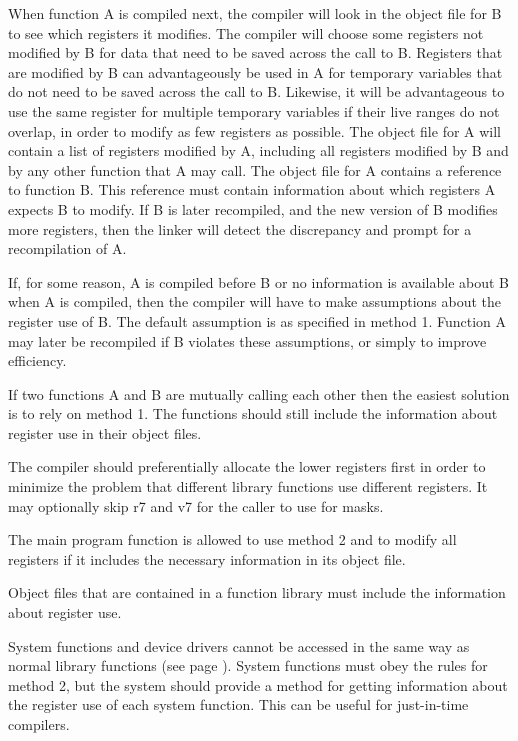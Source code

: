 \documentclass[forwardcom.tex]{subfiles}
\begin{document}
When function A is compiled next, the compiler will look in the object file for B to see which registers it modifies. The compiler will choose some registers not modified by B for data that need to be saved across the call to B. Registers that are modified by B can advantageously be used in A for temporary variables that do not need to be saved across the call to B. Likewise, it will be advantageous to use the same register for multiple temporary variables if their live ranges do not overlap, in order to modify as few registers as possible. The object file for A will contain a list of registers modified by A, including all registers modified by B and by any other function that A may call. The object file for A contains a reference to function B. This reference must contain information about which registers A expects B to modify. If B is later recompiled, and the new version of B modifies more registers, then the linker will detect the discrepancy and prompt for a recompilation of A.
\vspace{2mm}

If, for some reason, A is compiled before B or no information is available about B when A is compiled, then the compiler will have to make assumptions about the register use of B. The default assumption is as specified in method 1. Function A may later be recompiled if B violates these assumptions, or simply to improve efficiency. 
\vspace{2mm}

If two functions A and B are mutually calling each other then the easiest solution is to rely on method 1. The functions should still include the information about register use in their object files. 
\vspace{2mm}

The compiler should preferentially allocate the lower registers first in order to minimize the problem that different library functions use different registers. It may optionally skip r7 and v7 for the caller to use for masks. 
\vspace{2mm}

The main program function is allowed to use method 2 and to modify all registers if it includes the necessary information in its object file. 
\vspace{2mm}

Object files that are contained in a function library must include the information about register use. 
\vspace{2mm}

System functions and device drivers cannot be accessed in the same way as normal library functions (see page \pageref{systemCallIDSystem}). System functions must obey the rules for method 2, but the system should provide a method for getting information about the register use of each system function. This can be useful for just-in-time compilers. 
\end{document}
